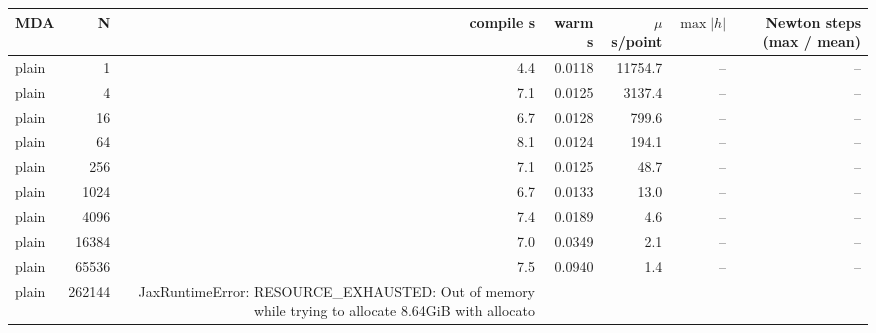 \begin{tabular}{lrrrrrr}
\toprule
MDA & N & compile s & warm s & $\mu$s/point & $\max|h|$ & Newton steps (max / mean) \\
\midrule
plain & 1 & 4.4 & 0.0118 & 11754.7 & -- & -- \\
plain & 4 & 7.1 & 0.0125 & 3137.4 & -- & -- \\
plain & 16 & 6.7 & 0.0128 & 799.6 & -- & -- \\
plain & 64 & 8.1 & 0.0124 & 194.1 & -- & -- \\
plain & 256 & 7.1 & 0.0125 & 48.7 & -- & -- \\
plain & 1024 & 6.7 & 0.0133 & 13.0 & -- & -- \\
plain & 4096 & 7.4 & 0.0189 & 4.6 & -- & -- \\
plain & 16384 & 7.0 & 0.0349 & 2.1 & -- & -- \\
plain & 65536 & 7.5 & 0.0940 & 1.4 & -- & -- \\
plain & 262144 & JaxRuntimeError: RESOURCE_EXHAUSTED: Out of memory while trying to allocate 8.64GiB with allocato &  &  &  &  \\
\bottomrule
\end{tabular}
